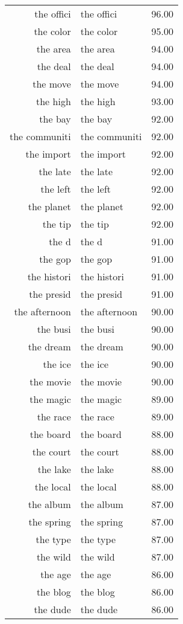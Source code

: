 \begin{table}[ht]
\begin{tabular}{rlr}
  the offici & the offici & 96.00 \\ 
  the color & the color & 95.00 \\ 
  the area & the area & 94.00 \\ 
  the deal & the deal & 94.00 \\ 
  the move & the move & 94.00 \\ 
  the high & the high & 93.00 \\ 
  the bay & the bay & 92.00 \\ 
  the communiti & the communiti & 92.00 \\ 
  the import & the import & 92.00 \\ 
  the late & the late & 92.00 \\ 
  the left & the left & 92.00 \\ 
  the planet & the planet & 92.00 \\ 
  the tip & the tip & 92.00 \\ 
  the d & the d & 91.00 \\ 
  the gop & the gop & 91.00 \\ 
  the histori & the histori & 91.00 \\ 
  the presid & the presid & 91.00 \\ 
  the afternoon & the afternoon & 90.00 \\ 
  the busi & the busi & 90.00 \\ 
  the dream & the dream & 90.00 \\ 
  the ice & the ice & 90.00 \\ 
  the movie & the movie & 90.00 \\ 
  the magic & the magic & 89.00 \\ 
  the race & the race & 89.00 \\ 
  the board & the board & 88.00 \\ 
  the court & the court & 88.00 \\ 
  the lake & the lake & 88.00 \\ 
  the local & the local & 88.00 \\ 
  the album & the album & 87.00 \\ 
  the spring & the spring & 87.00 \\ 
  the type & the type & 87.00 \\ 
  the wild & the wild & 87.00 \\ 
  the age & the age & 86.00 \\ 
  the blog & the blog & 86.00 \\ 
  the dude & the dude & 86.00 \\ 

\end{tabular}
\end{table}
